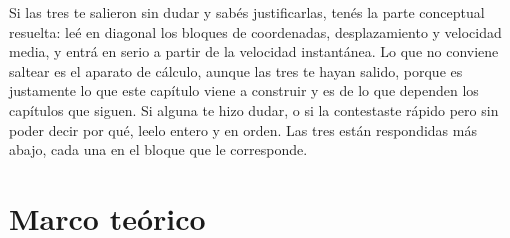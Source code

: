\documentclass[11pt,openany]{book}
\begin{document}
Si las tres te salieron sin dudar y sabés justificarlas, tenés la parte conceptual resuelta: leé en diagonal los bloques de coordenadas, desplazamiento y velocidad media, y entrá en serio a partir de la velocidad instantánea. Lo que no conviene saltear es el aparato de cálculo, aunque las tres te hayan salido, porque es justamente lo que este capítulo viene a construir y es de lo que dependen los capítulos que siguen. Si alguna te hizo dudar, o si la contestaste rápido pero sin poder decir por qué, leelo entero y en orden. Las tres están respondidas más abajo, cada una en el bloque que le corresponde.

\section{Marco teórico}
\end{document}

